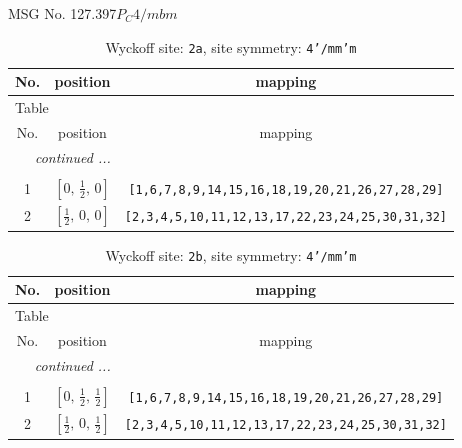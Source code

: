 \documentclass[fleqn,8pt]{jsarticle}
\begin{document}
\setcounter{MaxMatrixCols}{32}

\renewcommand{\tablename}{Table~}
\renewcommand{\figurename}{Figure~}
\begin{center}
\LARGE
MSG No. 127.397\quad$P_{C}4/mbm$
\end{center}
\renewcommand{\arraystretch}{1.2}
\begin{longtable}{ccc}
\caption{Wyckoff site: {\tt 2a}, site symmetry: {\tt 4'/mm'm}}
 \\
 \hline \hline
No. & position & mapping \\ \hline \endfirsthead

\multicolumn{2}{l}{\tablename\ \thetable{}} \\
 \hline \hline
No. & position & mapping \\ \hline \endhead

 \hline \hline
\multicolumn{2}{r}{\footnotesize\it continued ...} \\ \endfoot

 \hline \hline
\multicolumn{2}{r}{} \\ \endlastfoot

1 & $\left[ 0,\, \frac{1}{2},\, 0 \right]$ & {\tt [1,6,7,8,9,14,15,16,18,19,20,21,26,27,28,29]} \\ \hline
2 & $\left[ \frac{1}{2},\, 0,\, 0 \right]$ & {\tt [2,3,4,5,10,11,12,13,17,22,23,24,25,30,31,32]} \\
\end{longtable}
\renewcommand{\arraystretch}{1.2}
\begin{longtable}{ccc}
\caption{Wyckoff site: {\tt 2b}, site symmetry: {\tt 4'/mm'm}}
 \\
 \hline \hline
No. & position & mapping \\ \hline \endfirsthead

\multicolumn{2}{l}{\tablename\ \thetable{}} \\
 \hline \hline
No. & position & mapping \\ \hline \endhead

 \hline \hline
\multicolumn{2}{r}{\footnotesize\it continued ...} \\ \endfoot

 \hline \hline
\multicolumn{2}{r}{} \\ \endlastfoot

1 & $\left[ 0,\, \frac{1}{2},\, \frac{1}{2} \right]$ & {\tt [1,6,7,8,9,14,15,16,18,19,20,21,26,27,28,29]} \\ \hline
2 & $\left[ \frac{1}{2},\, 0,\, \frac{1}{2} \right]$ & {\tt [2,3,4,5,10,11,12,13,17,22,23,24,25,30,31,32]} \\
\end{longtable}
\end{document}
